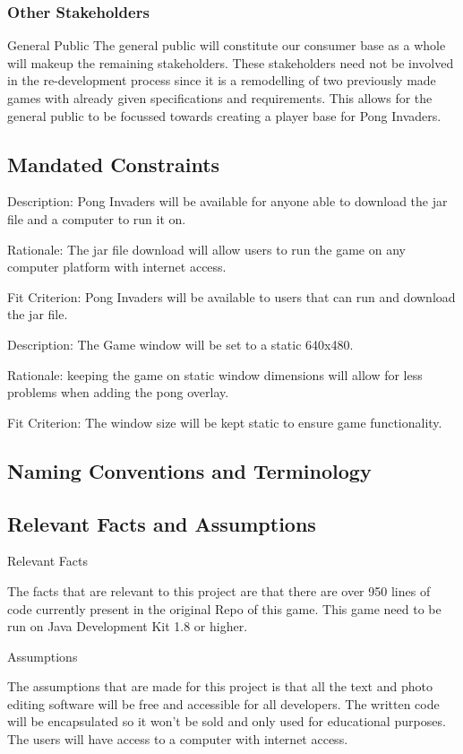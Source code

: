 \documentclass[12pt, titlepage]{article}
\begin{document}
\subsubsection{Other Stakeholders}
General Public
The general public will constitute our consumer base as a whole will makeup the remaining stakeholders. These stakeholders need not be involved in the re-development process since it is a remodelling of two previously made games with already given specifications and requirements. This allows for the general public to be focussed towards creating a player base for Pong Invaders. 
\subsection{Mandated Constraints}
Description: Pong Invaders will be available for anyone able to download the jar file and a computer to run it on.
 
Rationale: The jar file download will allow users to run the game on any computer platform with internet access.
 
Fit Criterion: Pong Invaders will be available to users that can run and download the jar file.
 

Description: The Game window will be set to a static 640x480.
 
Rationale: keeping the game on static window dimensions will allow for less problems when adding the pong overlay.
 
Fit Criterion: The window size will be kept static to ensure game functionality.

\subsection{Naming Conventions and Terminology}



\subsection{Relevant Facts and Assumptions}
Relevant Facts


The facts that are relevant to this project are that there are over 950 lines of code currently present in the original Repo of this game. This game need to be run on Java Development Kit 1.8 or higher.

Assumptions

The assumptions that are made for this project  is that all the text and photo editing software will be free and accessible for all developers. The written code will be encapsulated so it won’t be sold and only used for educational purposes. The users will have access to a computer with internet access. 
\end{document}
